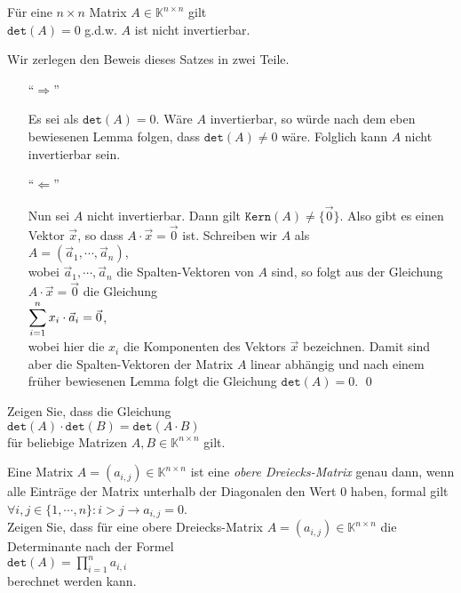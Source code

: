 \begin{Satz}
  F\"ur eine $n \times n$ Matrix $A \in \mathbb{K}^{n \times n}$ gilt
  \\[0.2cm]
  \hspace*{1.3cm}
  $\mathtt{det}(A) = 0$ \quad g.d.w. \quad $A$ ist nicht invertierbar.
\end{Satz}

\proof
Wir zerlegen den Beweis dieses Satzes in zwei Teile.
\begin{enumerate}
\item[``$\Rightarrow$'']
  
     Es sei als $\mathtt{det}(A) = 0$.  W\"are $A$ invertierbar, so w\"urde nach dem eben bewiesenen
     Lemma folgen, dass $\mathtt{det}(A) \not= 0$ w\"are.  Folglich kann $A$ nicht invertierbar sein.
\item[``$\Leftarrow$'']

     Nun sei $A$ nicht invertierbar.  Dann gilt $\mathtt{Kern}(A) \not= \{\vec{0}\}$.  Also gibt
     es einen Vektor $\vec{x}$, so dass $A \cdot \vec{x} = \vec{0}$ ist.  Schreiben wir
     $A$ als
     \\[0.2cm]
     \hspace*{1.3cm}
     $A = (\vec{a}_1, \cdots, \vec{a}_n)$,
     \\[0.2cm]
     wobei $\vec{a}_1,\cdots,\vec{a}_n$ die  Spalten-Vektoren von $A$ sind, so folgt aus
     der Gleichung $A \cdot \vec{x} = \vec{0}$ die Gleichung
     \\[0.2cm]
     \hspace*{1.3cm}
     $\displaystyle\sum\limits_{i=1}^n x_i \cdot \vec{a}_i = \vec{0}$,
     \\[0.2cm]
     wobei hier die $x_i$ die Komponenten des Vektors $\vec{x}$ bezeichnen.  Damit sind aber die
     Spalten-Vektoren der Matrix $A$ linear abh\"angig und nach einem fr\"uher bewiesenen Lemma folgt
     die Gleichung
     $\mathtt{det}(A) = 0$. \qed
\end{enumerate}

\exercise  
Zeigen Sie, dass die Gleichung  
\\[0.2cm] 
\hspace*{1.3cm}
$\mathtt{det}(A) \cdot \mathtt{det}(B) = \mathtt{det}(A \cdot B)$ 
\\[0.2cm] 
f\"ur beliebige Matrizen  $A, B \in \mathbb{K}^{n \times n}$ gilt.  
\eoxs  
 
\exercise
Eine Matrix $A = (a_{i,j}) \in \mathbb{K}^{n \times n}$ ist eine \emph{obere Dreiecks-Matrix} genau dann, wenn alle Eintr\"age der
Matrix unterhalb der Diagonalen den Wert $0$ haben, formal gilt
\\[0.2cm]
\hspace*{1.3cm}
$\forall i,j \in \{1,\cdots,n\}: i > j \rightarrow a_{i,j} = 0$.
\\[0.2cm]
Zeigen Sie, dass f\"ur eine obere Dreiecks-Matrix $A = (a_{i,j}) \in \mathbb{K}^{n \times n}$ die
Determinante nach der Formel
\\[0.2cm]
\hspace*{1.3cm}
$\mathtt{det}(A) = \prod\limits_{i=1}^n a_{i,i}$
\\[0.2cm]
berechnet werden kann.  
\vspace*{0.2cm}

